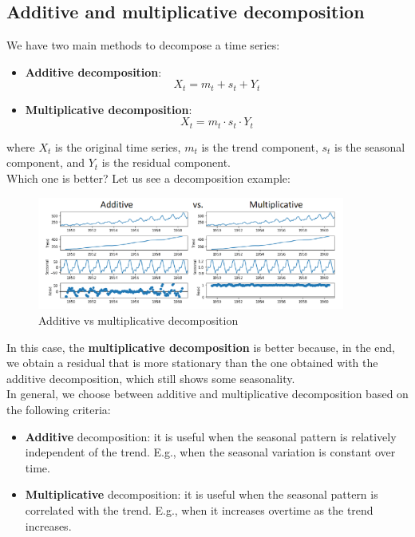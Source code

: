 \subsection{Additive and multiplicative decomposition}

We have two main methods to decompose a time series:
\begin{itemize}
    \item \textbf{Additive decomposition}: 
    $$X_t = m_t + s_t + Y_t$$

    \item \textbf{Multiplicative decomposition}:
    $$X_t = m_t \cdot s_t \cdot Y_t$$
\end{itemize}

where $X_t$ is the original time series, $m_t$ is the trend component, $s_t$ is the
seasonal component, and $Y_t$ is the residual component.\\

Which one is better? Let us see a decomposition example:

\begin{figure}[H]
    \centering
    \includegraphics[width=0.9\textwidth]{figures/add_vs_mult_decomp.png}
    \caption{Additive vs multiplicative decomposition}
    \label{fig:add_vs_mult}
\end{figure}

In this case, the \textbf{multiplicative decomposition} is better because, in the
end, we obtain a residual that is more stationary than the one obtained with the
additive decomposition, which still shows some seasonality.\\

In general, we choose between additive and multiplicative decomposition based on
the following criteria:

\begin{itemize}
    \item \textbf{Additive} decomposition: it is useful when the seasonal pattern
    is relatively independent of the trend. E.g., when the seasonal variation is
    constant over time.

    \item \textbf{Multiplicative} decomposition: it is useful when the seasonal
    pattern is correlated with the trend. E.g., when it increases overtime as the
    trend increases.
\end{itemize}

